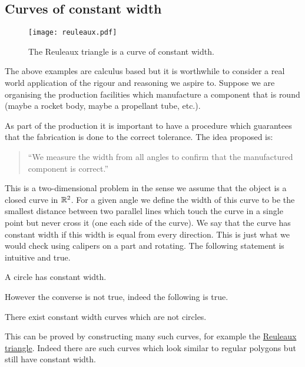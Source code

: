 \subsection*{Curves of constant width}
%
\begin{figure}[htb]
  \centering
  \texttt{[image: reuleaux.pdf]}
  \caption{The Reuleaux triangle is a curve of constant width.}%
  \label{fig:reuleaux}
\end{figure}
%
The above examples are calculus based but it is worthwhile to consider a real world application of the rigour and reasoning we aspire to.
Suppose we are organising the production facilities which manufacture a component that is round (maybe a rocket body, maybe a propellant tube, etc.).
\begin{samepage}
  As part of the production it is important to have a procedure which guarantees that the fabrication is done to the correct tolerance.
  The idea proposed is:
  \begin{quotation}
    ``We measure the width from all angles to confirm that the manufactured component is correct.''
  \end{quotation}
\end{samepage}
This is a two-dimensional problem in the sense we assume that the object is a closed curve in \(\mathbb{R}^2\).
For a given angle we define the width of this curve to be the smallest distance between two parallel lines which touch the curve in a single point but never cross it (one each side of the curve).
We say that the curve has constant width if this width is equal from every direction.
This is just what we would check using calipers on a part and rotating.
The following statement is intuitive and true.
\begin{theorem*}
  A circle has constant width.
\end{theorem*}
\noindent
However the converse is not true, indeed the following is true.
\begin{theorem*}
  There exist constant width curves which are not circles.
\end{theorem*}
\noindent
This can be proved by constructing many such curves, for example the \href{https://en.wikipedia.org/wiki/Reuleaux_triangle}{Reuleaux triangle}. Indeed there are such curves which look similar to regular polygons but still have constant width.





